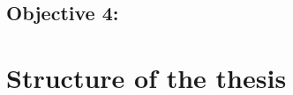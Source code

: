 \newcommand{\objectiveresearch}{} 

\subsection*{Objective 4: \objectiveresearch}
\label{subsec:intro:obj:applications}



\section{Structure of the thesis}
\label{sec:intro:structure}


